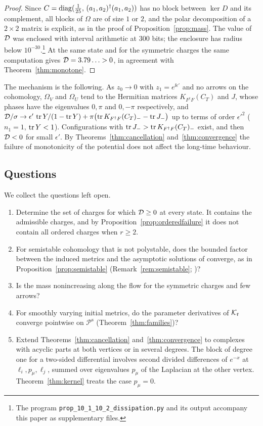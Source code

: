 \begin{proof}
Since $C=\operatorname{diag}(\frac1{25},\,(a_1,a_2)^\dagger(a_1,a_2))$ has no block between
$\ker D$ and its complement, all blocks of $\Omega$ are of size $1$ or
$2$, and the polar decomposition of a $2\times2$ matrix is explicit, as in
the proof of Proposition~\ref{prop:mass}. The value of $\mathcal D$ was enclosed
with interval arithmetic at $300$ bits; the enclosure has radius below
$10^{-30}$.\footnote{The program
\texttt{prop\_10\_1\_10\_2\_dissipation.py} and its output accompany this
paper as supplementary files.} At the same state and for the symmetric charges the same
computation gives $\mathcal D=3.79\ldots>0$, in agreement with
Theorem~\ref{thm:monotone}.
\end{proof}

The mechanism is the following. As $z_0\to0$ with $z_1=e^{\ii\epsilon'}$ and
no arrows on the cohomology, $\Omega_V$ and $\Omega_U$ tend to the Hermitian
matrices $K_{F^\dagger F}(C_T)$ and $J$, whose phases have the eigenvalues
$0,\pi$ and $0,-\pi$ respectively, and
$\mathcal D/\sigma\to\epsilon'\,\operatorname{tr} Y/(1-\operatorname{tr} Y)+\pi\bigl(\operatorname{tr} K_{F^\dagger F}(C_T)_--\operatorname{tr} J_-\bigr)$
up to terms of order $\epsilon'^2$ ($n_1=1$, $\operatorname{tr} Y<1$). Configurations with
$\operatorname{tr} J_->\operatorname{tr} K_{F^\dagger F}(C_T)_-$ exist, and then $\mathcal D<0$ for small
$\epsilon'$. By
Theorems~\ref{thm:cancellation} and~\ref{thm:convergence} the failure of
monotonicity of the potential does not affect the long-time behaviour.

\subsection{Questions}
We collect the questions left open.
\begin{enumerate}
\item Determine the set of charges for which $\mathcal D\geq0$ at every state. It
 contains the admissible charges, and by
 Proposition~\ref{prop:orderedfailure} it does not contain all ordered
 charges when $r\geq2$.
\item For semistable cohomology that is not polystable, does the bounded
 factor between the induced metrics and the asymptotic solutions of
 \cite{hkkp23} converge, as in Proposition~\ref{prop:semistable}
 (Remark~\ref{rem:semistable}; \cite[Corollary~6.5]{wue26b})?
\item Is the mass nonincreasing along the flow for the symmetric charges and
 few arrows?
\item For smoothly varying initial metrics, do the parameter derivatives of $\mathcal K_t$ converge pointwise on
 $\mathcal P^{\mathrm s}$ (Theorem~\ref{thm:families})?
\item Extend Theorems~\ref{thm:cancellation} and~\ref{thm:convergence} to
 complexes with acyclic parts at both vertices or in several degrees. The
 block of degree one for a two-sided differential involves second divided
 differences of $e^{-x}$ at $\ell_i,p_\mu,\ell_j$, summed over eigenvalues
 $p_\mu$ of the Laplacian at the other vertex. Theorem~\ref{thm:kernel}
 treats the case $p_\mu=0$.
\end{enumerate}
